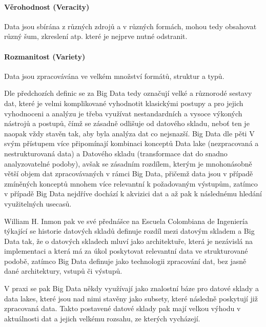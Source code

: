 \documentclass[
  digital,     %
  twoside,     %
  lof,         %
  lot,         %
]{fithesis4}
\begin{document}
\paragraph{Věrohodnost (Veracity)}
Data jsou sbírána z různých zdrojů a v různých formách, mohou tedy obsahovat různý šum, zkreslení atp. které je nejprve nutné odstranit.

\paragraph{Rozmanitost (Variety)}
Data jsou zpracovávána ve velkém množství formátů, struktur a typů.


Dle předchozích definic se za Big Data tedy označují velké a různorodé sestavy dat, které je velmi komplikované vyhodnotit klasickými postupy a pro jejich vyhodnoceni a analýzu je  třeba využívat nestandardních a vysoce výkoných nástrojů a postupů, čímž se zásadně odlišuje od datového skladu, neboť ten je naopak vždy stavěn tak, aby byla analýza dat co nejsnazší.  Big Data dle pěti V svým přístupem více připomínají kombinaci konceptů Data lake (nezpracovaná a nestrukturovaná data) a Datového skladu (transformace dat do snadno analyzovatelné podoby), avšak se zásadním rozdílem, kterým je mnohonásobně větší objem dat zpracovávaných v rámci Big Data, přičemž data jsou v případě zmíněných konceptů mnohem více relevantní k požadovaným výstupům, zatímco v případě Big Data nejdříve dochází k akvizici dat a až pak k následnému hledání využitelných usecasů.

William H. Inmon pak ve své přednášce na Escuela Colombiana de Ingeniería týkající se historie datových skladů definuje rozdíl mezi datovým skladem a Big Data tak, že o datových skladech mluví jako architektuře, která je nezávislá na implementaci a která má za úkol poskytovat relevantní data ve strukturované podobě, zatímco Big Data definuje jako technologii zpracování dat, bez jasně dané architektury, vstupů či výstupů. \parencite{Inmon2021}

V praxi se pak Big Data někdy využívají jako znalostní báze pro datové sklady a data lakes, které jsou nad nimi stavěny jako subsety, které následně poskytují již zpracovaná data. Takto postavené datové sklady pak mají velkou výhodu v aktuálnosti dat a jejich velkému rozsahu, ze kterých vycházejí. 
\end{document}
